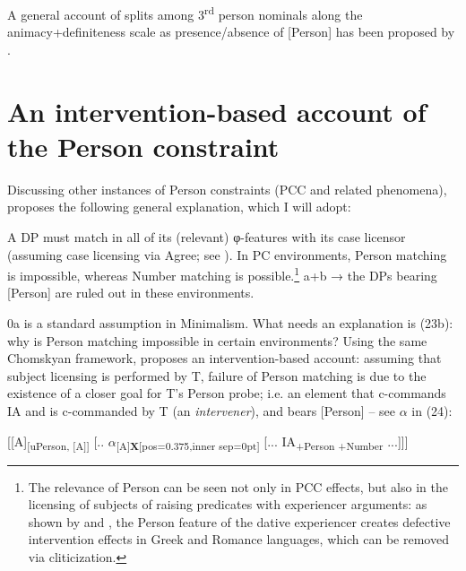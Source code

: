 \documentclass[output=paper]{langsci/langscibook}
\begin{document}
A general account of splits among 3\textsuperscript{rd} person nominals along the animacy+definiteness scale as presence/absence of [Person] has been proposed by \citet{Richards2008}.

\section{An intervention-based account of the Person constraint}%

Discussing other instances of Person constraints (PCC and related phenomena), \citet{Rezac2011} proposes the following general explanation, which I will adopt:

\ea\label{ex:guirgea:23}\label{bkm:Ref443240869}
        \ea A DP must match in all of its (relevant) φ-features with its case licensor (assuming case licensing via Agree; see \citealt{Chomsky2000,Chomsky2001Derivation}).
        \ex In PC environments, Person matching is impossible, whereas Number matching is possible.\footnote{The relevance of Person can be seen not only in PCC effects, but also in the licensing of subjects of raising predicates with experiencer arguments: as shown by \citet{Anagnostopoulou2003,Anagnostopoulou2005Cross} and \citet{Marchis2013}, the Person feature of the dative experiencer creates defective intervention effects in Greek and Romance languages, which can be removed via cliticization.}  
        \ex  a+b → the DPs bearing [Person] are ruled out in these environments.
        \z
\z

0a is a standard assumption in Minimalism. What needs an explanation is (23b): why is Person matching impossible in certain environments? Using the same Chomskyan framework, \citet{Rezac2011} proposes an intervention-based account: assuming that subject licensing is performed by T, failure of Person matching is due to the existence of a closer goal for T’s Person probe; i.e. an element that c-commands IA and is c-commanded by T (an \textit{intervener}), and bears [Person] – see $\alpha $ in (24):

\ea%
    \label{ex:giurgea:24}
    [[A]\textsubscript{[uPerson, [A]]}  [.. $\alpha $\textsubscript{[A]{\textsf{\bfseries X}}[pos=0.375,inner sep=0pt]}  [... IA\textsubscript{+Person +Number} ...]]]
\z
\end{document}
